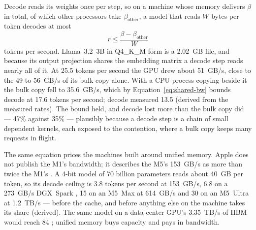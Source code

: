

Decode reads its weights once per step, so on a machine whose memory delivers
$\beta$ in total, of which other processors take $\beta_{\mathrm{other}}$, a
model that reads $W$ bytes per token decodes at most
\begin{equation}
r \le \frac{\beta - \beta_{\mathrm{other}}}{W}
\label{eq:shared-bw}
\end{equation}
tokens per second. Llama~3.2~3B in Q4\_K\_M form is a 2.02~GB file, and because
its output projection shares the embedding matrix a decode step reads nearly
all of it. At 25.5 tokens per second the GPU drew about 51~GB/s, close to the
49 to 56~GB/s of its bulk copy alone. With a CPU process copying beside it the
bulk copy fell to 35.6~GB/s, which by Equation~\ref{eq:shared-bw} bounds decode
at 17.6 tokens per second; decode measured 13.5 (derived from the measured
rates). The bound held, and decode lost more than the bulk copy did --- 47\%
against 35\% --- plausibly because a decode step is a chain of small dependent
kernels, each exposed to the contention, where a bulk copy keeps many requests
in flight.

The same equation prices the machines built around unified memory. Apple does
not publish the M1's bandwidth; it describes the M5's 153~GB/s as more than
twice the M1's \cite{apple2025m5}. A 4-bit model of 70 billion parameters reads
about 40~GB per token, so its decode ceiling is 3.8 tokens per second at
153~GB/s, 6.8 on a 273~GB/s DGX~Spark \cite{nvidia2026dgxspark}, 15 on an M5~Max
at 614~GB/s and 30 on an M5~Ultra at 1.2~TB/s \cite{apple2026m5ultra} --- before
the cache, and before anything else on the machine takes its share
(derived). The same model on a data-center GPU's 3.35~TB/s of HBM would reach
84 \cite{nvidia2026h100}; unified memory buys capacity and pays in bandwidth.

